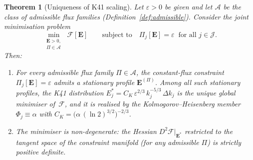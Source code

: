 \documentclass[12pt,a4paper]{article}
\theoremstyle{definition}
\theoremstyle{plain}
\newtheorem{theorem}[definition]{Theorem}
\theoremstyle{remark}
\begin{document}
\begin{theorem}[Uniqueness of K41 scaling]\label{thm:K41}
Let $\varepsilon > 0$ be given and let $\mathscr{A}$ be the class of
admissible flux families (Definition~\ref{def:admissible}).
Consider the \emph{joint} minimisation problem
\begin{equation}\label{eq:min}
  \min_{\substack{\mathbf{E} > 0,\\ \Pi \in \mathscr{A}}}
  \;\mathcal{F}[\mathbf{E}]
  \qquad \text{subject to} \quad
  \Pi_j[\mathbf{E}] = \varepsilon
  \;\;\text{for all } j \in \mathcal{J}.
\end{equation}
Then:
\begin{enumerate}
  \item[\textup{(i)}]
    For \emph{every} admissible flux family $\Pi \in \mathscr{A}$, the
    constant-flux constraint $\Pi_j[\mathbf{E}] = \varepsilon$ admits a
    stationary profile $\mathbf{E}^{(\Pi)}$.  Among all such stationary
    profiles, the K41 distribution
    $E_j^* = C_K\,\varepsilon^{2/3}\,k_j^{-5/3}\,\Delta k_j$
    is the unique global minimiser of~$\mathcal{F}$, and it is realised
    by the Kolmogorov--Heisenberg member $\Phi_j \equiv \alpha$ with
    $C_K = \bigl(\alpha\,(\ln 2)^{3/2}\bigr)^{-2/3}$.
  \item[\textup{(ii)}]
    The minimiser is non-degenerate: the Hessian
    $D^2\mathcal{F}|_{\mathbf{E}^*}$ restricted to the tangent space of
    the constraint manifold (for any admissible $\Pi$) is strictly positive
    definite.
\end{enumerate}
\end{theorem}
\end{document}
